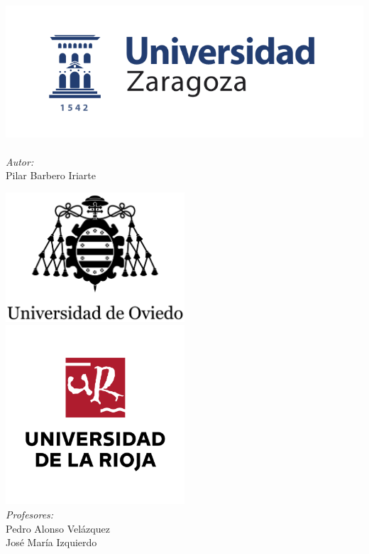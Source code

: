 \documentclass[a4paper,12pt]{article}
\begin{document}
\begin{titlepage}
\begin{center}
\noindent
\begin{minipage}{0.4\textwidth}
\begin{flushleft} \large
\includegraphics[width=1.1\textwidth]{images/logoUZ.png}~\\[4.5cm]
\emph{Autor:}\\
Pilar Barbero Iriarte 
\end{flushleft}
\end{minipage}%
\begin{minipage}{0.4\textwidth}
\begin{flushright} \large
\includegraphics[width=0.5\textwidth]{images/logoUNIOVI.png}~\\[1cm]
\includegraphics[width=0.5\textwidth]{images/logoUNIRIOJA.png}~\\[1cm]

\emph{Profesores:} \\
Pedro Alonso Vel\'azquez\\
Jos\'e Mar\'ia Izquierdo
\end{flushright}
\end{minipage}

\end{center}


\end{titlepage}
\end{document}
